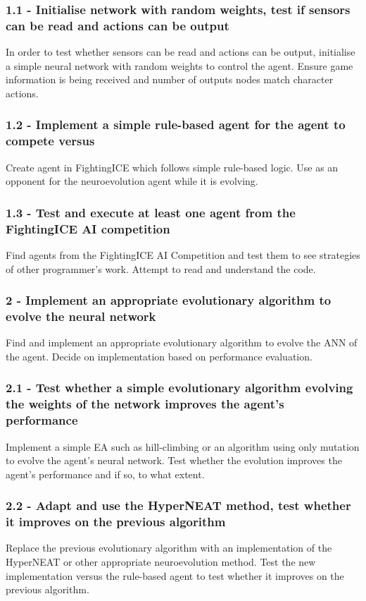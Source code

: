 \documentclass[12pt,a4paper]{article}
\begin{document}
\subsubsection*{1.1 - Initialise network with random weights, test if sensors can be read and actions can be output}
In order to test whether sensors can be read and actions can be output, initialise a simple neural network with random weights to control the agent. Ensure game information is being received and number of outputs nodes match character actions.
\subsubsection*{1.2 - Implement a simple rule-based agent for the agent to compete versus}
Create agent in FightingICE which follows simple rule-based logic. Use as an opponent for the neuroevolution agent while it is evolving.
\subsubsection*{1.3 - Test and execute at least one agent from the FightingICE AI competition}
Find agents from the FightingICE AI Competition and test them to see strategies of other programmer's work. Attempt to read and understand the code.
\subsubsection*{2 - Implement an appropriate evolutionary algorithm to evolve the neural network}
Find and implement an appropriate evolutionary algorithm to evolve the ANN of the agent. Decide on implementation based on performance evaluation.
\subsubsection*{2.1 - Test whether a simple evolutionary algorithm evolving the weights of the network improves the agent's performance}
Implement a simple EA such as hill-climbing or an algorithm using only mutation to evolve the agent's neural network. Test whether the evolution improves the agent's performance and if so, to what extent.
\newpage
\subsubsection*{2.2 - Adapt and use the HyperNEAT method, test whether it improves on the previous algorithm}
Replace the previous evolutionary algorithm with an implementation of the HyperNEAT or other appropriate neuroevolution method. Test the new implementation versus the rule-based agent to test whether it improves on the previous algorithm.
\end{document}
